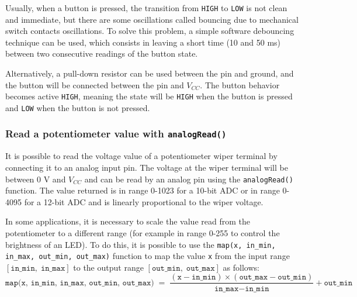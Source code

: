 Usually, when a button is pressed, the transition from \texttt{HIGH} to \texttt{LOW} is not clean and immediate, but there
are some oscillations called bouncing due to mechanical switch contacts oscillations. To solve this problem, a simple software
debouncing technique can be used, which consists in leaving a short time (10 and 50 ms) between two consecutive readings
of the button state.

Alternatively, a pull-down resistor can be used between the pin and ground, and the button will be connected between the pin
and \(V_{CC}\). The button behavior becomes active \texttt{HIGH}, meaning the state will be \texttt{HIGH} when the button
is pressed and \texttt{LOW} when the button is not pressed. 

\subsubsection*{Read a potentiometer value with \texttt{analogRead()}}
It is possible to read the voltage value of a potentiometer wiper terminal by connecting it to an analog input pin. The voltage
at the wiper terminal will be between 0 V and \(V_{CC}\) and can be read by an analog pin using the \texttt{analogRead()} function.
The value returned is in range 0-1023 for a 10-bit ADC or in range 0-4095 for a 12-bit ADC and is linearly
proportional to the wiper voltage.

In some applications, it is necessary to scale the value read from the potentiometer to a different range (for example in range 0-255
to control the brightness of an LED). To do this, it is possible to use the \texttt{map(x, in\_min, in\_max, out\_min, out\_max)}
function to map the value \texttt{x} from the input range \([\texttt{in\_min}, \; \texttt{in\_max}]\) to the output range
\([\texttt{out\_min}, \; \texttt{out\_max}]\) as follows:
\[\texttt{map(x, in\_min, in\_max, out\_min, out\_max)} \; = \; \frac{(\texttt{x} - \texttt{in\_min}) \times (\texttt{out\_max} - \texttt{out\_min})}{\texttt{in\_max} - \texttt{in\_min}} + \texttt{out\_min}\]

